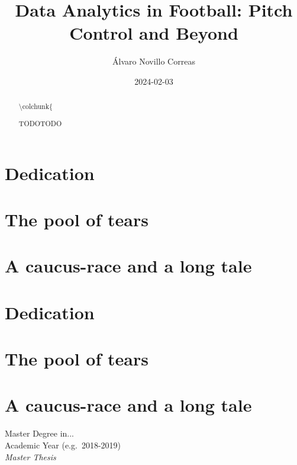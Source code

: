 \documentclass[twoside,nohyper]{tufte-book}
\title{Data Analytics in Football: Pitch Control and Beyond}
\author{Álvaro Novillo Correas}
\date{2024-02-03}
\begin{document}
\maketitle

\begin{abstract}
\noindent \textbackslash colchunk\{

 TODOTODO
\end{abstract}


{
\setcounter{tocdepth}{1}
\tableofcontents
}

\listoffigures

\hypertarget{dedication}{%
\chapter{Dedication}\label{dedication}}

\hypertarget{the-pool-of-tears}{%
\chapter{The pool of tears}\label{the-pool-of-tears}}

\hypertarget{a-caucus-race-and-a-long-tale}{%
\chapter{A caucus-race and a long tale}\label{a-caucus-race-and-a-long-tale}}

\listoffigures

\hypertarget{dedication-1}{%
\chapter{Dedication}\label{dedication-1}}

\hypertarget{the-pool-of-tears-1}{%
\chapter{The pool of tears}\label{the-pool-of-tears-1}}

\hypertarget{a-caucus-race-and-a-long-tale-1}{%
\chapter{A caucus-race and a long tale}\label{a-caucus-race-and-a-long-tale-1}}

Master Degree in...\\
Academic Year (e.g.~2018-2019)\\
\emph{Master Thesis}
\end{document}
